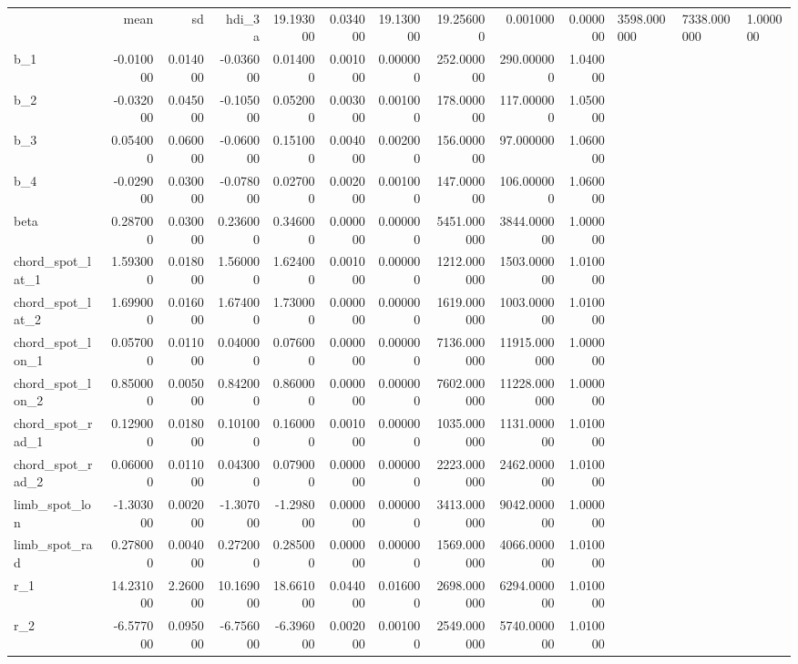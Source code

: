 \begin{tabular}{lrrrrrrrrr}
\toprule
 & mean & sd & hdi_3%
\midrule
a & 19.193000 & 0.034000 & 19.130000 & 19.256000 & 0.001000 & 0.000000 & 3598.000000 & 7338.000000 & 1.000000 \\
b_1 & -0.010000 & 0.014000 & -0.036000 & 0.014000 & 0.001000 & 0.000000 & 252.000000 & 290.000000 & 1.040000 \\
b_2 & -0.032000 & 0.045000 & -0.105000 & 0.052000 & 0.003000 & 0.001000 & 178.000000 & 117.000000 & 1.050000 \\
b_3 & 0.054000 & 0.060000 & -0.060000 & 0.151000 & 0.004000 & 0.002000 & 156.000000 & 97.000000 & 1.060000 \\
b_4 & -0.029000 & 0.030000 & -0.078000 & 0.027000 & 0.002000 & 0.001000 & 147.000000 & 106.000000 & 1.060000 \\
beta & 0.287000 & 0.030000 & 0.236000 & 0.346000 & 0.000000 & 0.000000 & 5451.000000 & 3844.000000 & 1.000000 \\
chord_spot_lat_1 & 1.593000 & 0.018000 & 1.560000 & 1.624000 & 0.001000 & 0.000000 & 1212.000000 & 1503.000000 & 1.010000 \\
chord_spot_lat_2 & 1.699000 & 0.016000 & 1.674000 & 1.730000 & 0.000000 & 0.000000 & 1619.000000 & 1003.000000 & 1.010000 \\
chord_spot_lon_1 & 0.057000 & 0.011000 & 0.040000 & 0.076000 & 0.000000 & 0.000000 & 7136.000000 & 11915.000000 & 1.000000 \\
chord_spot_lon_2 & 0.850000 & 0.005000 & 0.842000 & 0.860000 & 0.000000 & 0.000000 & 7602.000000 & 11228.000000 & 1.000000 \\
chord_spot_rad_1 & 0.129000 & 0.018000 & 0.101000 & 0.160000 & 0.001000 & 0.000000 & 1035.000000 & 1131.000000 & 1.010000 \\
chord_spot_rad_2 & 0.060000 & 0.011000 & 0.043000 & 0.079000 & 0.000000 & 0.000000 & 2223.000000 & 2462.000000 & 1.010000 \\
limb_spot_lon & -1.303000 & 0.002000 & -1.307000 & -1.298000 & 0.000000 & 0.000000 & 3413.000000 & 9042.000000 & 1.000000 \\
limb_spot_rad & 0.278000 & 0.004000 & 0.272000 & 0.285000 & 0.000000 & 0.000000 & 1569.000000 & 4066.000000 & 1.010000 \\
r_1 & 14.231000 & 2.260000 & 10.169000 & 18.661000 & 0.044000 & 0.016000 & 2698.000000 & 6294.000000 & 1.010000 \\
r_2 & -6.577000 & 0.095000 & -6.756000 & -6.396000 & 0.002000 & 0.001000 & 2549.000000 & 5740.000000 & 1.010000 \\

\end{tabular}
